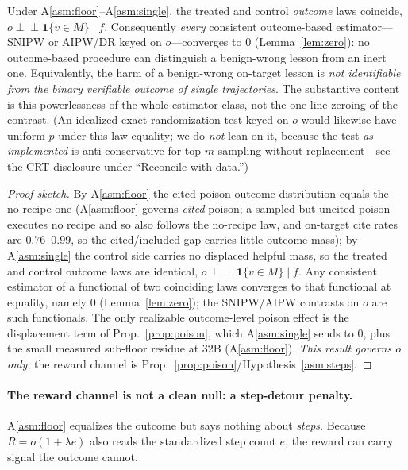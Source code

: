\begin{proposition}\label{thm:main}
Under A\ref{asm:floor}--A\ref{asm:single}, the treated and control \emph{outcome} laws
coincide, $o\perp\!\!\!\perp \mathbf 1\{v\in M\}\mid f$. Consequently \emph{every}
consistent outcome-based estimator---SNIPW or AIPW/DR keyed on $o$---converges to $0$
(Lemma~\ref{lem:zero}): no outcome-based procedure can distinguish a benign-wrong lesson
from an inert one. Equivalently, the harm of
a benign-wrong on-target lesson is \emph{not identifiable from the binary verifiable
outcome of single trajectories}. The substantive content is this powerlessness of the
whole estimator class, not the one-line zeroing of the contrast. (An idealized exact
randomization test keyed on $o$ would likewise have uniform $p$ under this law-equality;
we do \emph{not} lean on it, because the test \emph{as implemented} is anti-conservative
for top-$m$ sampling-without-replacement---see the CRT disclosure under ``Reconcile with
data.'')
\end{proposition}
\begin{proof}[Proof sketch]
By A\ref{asm:floor} the cited-poison outcome distribution equals the no-recipe one
(A\ref{asm:floor} governs \emph{cited} poison; a sampled-but-uncited poison executes no
recipe and so also follows the no-recipe law, and on-target cite rates are
$0.76$--$0.99$, so the cited/included gap carries little outcome mass);
by A\ref{asm:single} the control side carries no displaced helpful mass, so the
treated and control outcome laws are identical, $o\perp\!\!\!\perp\mathbf
1\{v\in M\}\mid f$. Any consistent estimator of a functional of two coinciding laws
converges to that functional at equality, namely $0$ (Lemma~\ref{lem:zero}); the
SNIPW/AIPW contrasts on $o$ are such functionals. The only realizable outcome-level
poison effect is the displacement term of Prop.~\ref{prop:poison}, which A\ref{asm:single}
sends to $0$, plus the small measured sub-floor residue at 32B (A\ref{asm:floor}).
\emph{This result governs $o$ only}; the reward channel is
Prop.~\ref{prop:poison}/Hypothesis~\ref{asm:steps}. \end{proof}

\paragraph{The reward channel is not a clean null: a step-detour penalty.}
A\ref{asm:floor} equalizes the outcome but says nothing about \emph{steps}. Because
$R=o(1{+}\lambda e)$ also reads the standardized step count $e$, the reward can carry
signal the outcome cannot.

